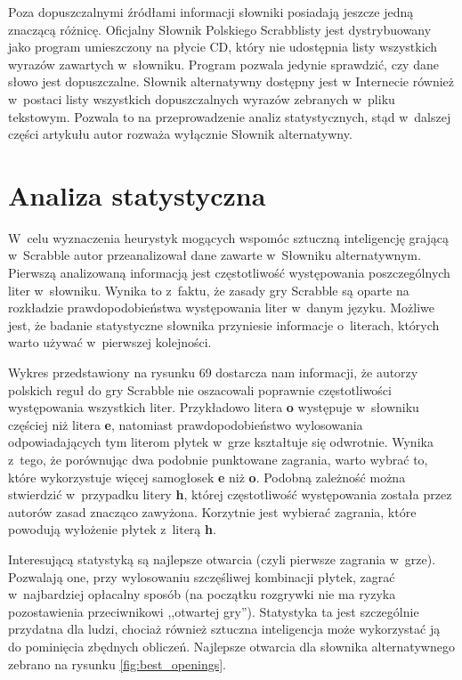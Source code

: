 \documentclass[a4paper,twocolumn,12pt]{article}
\theoremstyle{definition}
\begin{document}
Poza dopuszczalnymi źródłami informacji słowniki posiadają jeszcze jedną znaczącą różnicę. Oficjalny Słownik Polskiego Scrabblisty jest dystrybuowany jako program umieszczony na płycie CD, który nie udostępnia listy wszystkich wyrazów zawartych w~słowniku. Program pozwala jedynie sprawdzić, czy dane słowo jest dopuszczalne. Słownik alternatywny dostępny jest w Internecie również w~postaci listy wszystkich dopuszczalnych wyrazów zebranych w~pliku tekstowym. Pozwala to na przeprowadzenie analiz statystycznych, stąd w~dalszej części artykułu autor rozważa wyłącznie Słownik alternatywny.

\section*{Analiza statystyczna}

W~celu wyznaczenia heurystyk mogących wspomóc sztuczną inteligencję grającą w~Scrabble autor przeanalizował dane zawarte w~Słowniku alternatywnym. Pierwszą analizowaną informacją jest częstotliwość występowania poszczególnych liter w~słowniku. Wynika to z~faktu, że zasady gry Scrabble są oparte na rozkładzie prawdopodobieństwa występowania liter w~danym języku. Możliwe jest, że badanie statystyczne słownika przyniesie informacje o~literach, których warto używać w~pierwszej kolejności.

Wykres przedstawiony na rysunku 69 dostarcza nam informacji, że autorzy polskich reguł do gry Scrabble nie oszacowali poprawnie częstotliwości występowania wszystkich liter. Przykładowo litera \textbf{o} występuje w~słowniku częściej niż litera \textbf{e}, natomiast prawdopodobieństwo wylosowania odpowiadających tym literom płytek w~grze kształtuje się odwrotnie. Wynika z~tego, że porównując dwa podobnie punktowane zagrania, warto wybrać to, które wykorzystuje więcej samogłosek \textbf{e} niż \textbf{o}. Podobną zależność można stwierdzić w~przypadku litery \textbf{h}, której częstotliwość występowania została przez autorów zasad znacząco zawyżona. Korzytnie jest wybierać zagrania, które powodują wyłożenie płytek z~literą \textbf{h}.

Interesującą statystyką są najlepsze otwarcia (czyli pierwsze zagrania w~grze). Pozwalają one, przy wylosowaniu szczęśliwej kombinacji płytek, zagrać w~najbardziej opłacalny sposób (na początku rozgrywki nie ma ryzyka pozostawienia przeciwnikowi ,,otwartej gry''). Statystyka ta jest szczególnie przydatna dla ludzi, chociaż również sztuczna inteligencja może wykorzystać ją do pominięcia zbędnych obliczeń. Najlepsze otwarcia dla słownika alternatywnego zebrano na rysunku \ref{fig:best_openings}.
\end{document}
